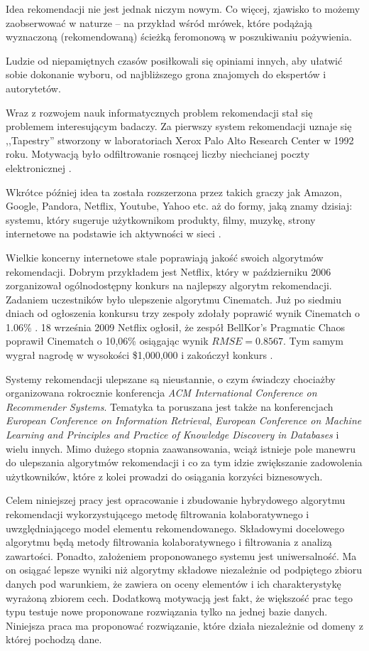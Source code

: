 \documentclass[twoside]{iisthesis}
\begin{document}
	 Idea rekomendacji nie jest jednak niczym nowym. Co więcej, zjawisko to możemy zaobserwować w naturze -- na przykład wśród mrówek, które podążają wyznaczoną (rekomendowaną) ścieżką feromonową w poszukiwaniu pożywienia.
	 
	 Ludzie od niepamiętnych czasów posiłkowali się opiniami innych, aby ułatwić sobie dokonanie wyboru, od najbliższego grona znajomych do ekspertów i autorytetów.
	 
	 Wraz z rozwojem nauk informatycznych problem rekomendacji stał się problemem interesującym badaczy. Za pierwszy system rekomendacji uznaje się ,,Tapestry'' stworzony w laboratoriach Xerox Palo Alto Research Center w 1992 roku. Motywacją było odfiltrowanie rosnącej liczby niechcianej poczty elektronicznej \cite{id:FromTapestryToSVD}.
	 
	 Wkrótce później idea ta została rozszerzona przez takich graczy jak Amazon, Google, Pandora, Netflix, Youtube, Yahoo etc. aż do formy, jaką znamy dzisiaj: systemu, który sugeruje użytkownikom produkty, filmy, muzykę, strony internetowe na podstawie ich aktywności w sieci \cite{id:EvolutionOfRecommenderSystems}. 
	 
	 Wielkie koncerny internetowe stale poprawiają jakość swoich algorytmów rekomendacji. Dobrym przykładem jest Netflix, który w październiku 2006 zorganizował ogólnodostępny konkurs na najlepszy algorytm rekomendacji. Zadaniem uczestników było ulepszenie algorytmu Cinematch. Już po siedmiu dniach od ogłoszenia konkursu trzy zespoły zdołały poprawić wynik Cinematch o 1.06\% \cite{id:NetflixPrize,id:NetflixPrizeRankings}. 18 września 2009 Netflix ogłosił, że zespół BellKor's Pragmatic Chaos poprawił Cinematch o 10,06\% osiągając wynik $RMSE = 0.8567$. Tym samym wygrał nagrodę w wysokości \$1,000,000 i zakończył konkurs \cite{id:NetflixPrize2,id:NetflixPrizeRules}.
	 
	 Systemy rekomendacji ulepszane są nieustannie, o czym świadczy chociażby organizowana rokrocznie konferencja\textit{ ACM International Conference on Recommender Systems}. Tematyka ta poruszana jest także na konferencjach \textit{European Conference on Information Retrieval}, \textit{European Conference on Machine Learning and Principles and Practice of Knowledge Discovery in Databases} i wielu innych. Mimo dużego stopnia zaawansowania, wciąż istnieje pole manewru do ulepszania algorytmów rekomendacji i co za tym idzie zwiększanie zadowolenia użytkowników, które z kolei prowadzi do osiągania korzyści biznesowych.
	 
	 Celem niniejszej pracy jest opracowanie i zbudowanie hybrydowego algorytmu rekomendacji wykorzystującego metodę filtrowania kolaboratywnego i uwzględniającego model elementu rekomendowanego. Składowymi docelowego algorytmu będą metody filtrowania kolaboratywnego i filtrowania z analizą zawartości. Ponadto, założeniem proponowanego systemu jest uniwersalność. Ma on osiągać lepsze wyniki niż algorytmy składowe niezależnie od podpiętego zbioru danych pod warunkiem, że zawiera on oceny elementów i ich charakterystykę wyrażoną zbiorem cech. Dodatkową motywacją jest fakt, że większość prac tego typu testuje nowe proponowane rozwiązania tylko na jednej bazie danych. Niniejsza praca ma proponować rozwiązanie, które działa niezależnie od domeny z której pochodzą dane.
	 
\end{document}
